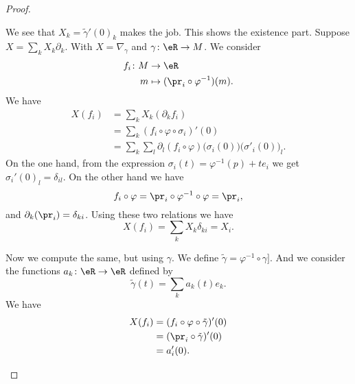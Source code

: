 \begin{proof}
\begin{subproof}
		We see that \( X_k=\tilde \gamma'(0)_k\) makes the job. This shows the existence part.
		\spitem[Unicity]
		Suppose \( X=\sum_kX_k\partial_k\). With \( X=\nabla_{\gamma}\) and \(\gamma \colon \eR\to M  \). We consider
		\begin{equation}
			\begin{aligned}
				f_i\colon M & \to \eR                              \\
				m           & \mapsto (\pr_i\circ\varphi^{-1})(m).
			\end{aligned}
		\end{equation}
		We have
		\begin{subequations}
			\begin{align}
				X(f_i) & =\sum_kX_k(\partial_kf_i)                                                                  \\
				       & =\sum_k(f_i\circ\varphi\circ\sigma_i)'(0)                                                  \\
				       & =\sum_k\sum_l\partial_l(f_i\circ\varphi)\big( \sigma_i(0) \big)\big( \sigma'_i(0) \big)_l.
			\end{align}
		\end{subequations}
		On the one hand, from the expression \( \sigma_i(t)=\varphi^{-1}(p)+te_i\) we get \( \sigma_i'(0)_l=\delta_{il}\). On the other hand we have
		\begin{equation}
			f_i\circ\varphi=\pr_i\circ\varphi^{-1}\circ\varphi=\pr_i,
		\end{equation}
		and \( \partial_k(\pr_i)=\delta_{ki}\). Using these two relations we have
		\begin{equation}
			X(f_i)=\sum_kX_k\delta_{ki}=X_i.
		\end{equation}

		Now we compute the same, but using \( \gamma\). We define \( \tilde \gamma=\varphi^{-1}\circ\gamma]\). And we consider the functions \(a_k \colon \eR\to \eR  \) defined by
		\begin{equation}
			\tilde \gamma(t)=\sum_ka_k(t)e_k.
		\end{equation}
		We have
		\begin{subequations}
			\begin{align}
				X(f_i) & =(f_i\circ\varphi\circ\tilde \gamma)'(0) \\
				       & =(\pr_i\circ\tilde \gamma)'(0)           \\
				       & =a'_i(0).
			\end{align}
		\end{subequations}


\end{subproof}
\end{proof}
